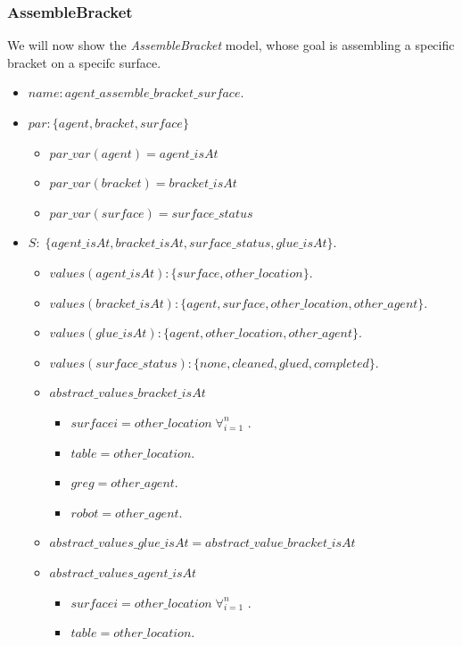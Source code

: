 \subsubsection{AssembleBracket}
We will now show the \textit{AssembleBracket} model, whose goal is assembling a specific bracket on a specifc surface.
\begin{itemize}
	\item $name: agent\_assemble\_bracket\_surface$.
	\item		$par: \{agent,bracket,surface\}$
		\begin{itemize}
			\item $par\_var(agent)=agent\_isAt$
			\item $par\_var(bracket)=bracket\_isAt$
			\item $par\_var(surface)=surface\_status$
		\end{itemize}

	\item $S:\;\{agent\_isAt,bracket\_isAt,surface\_status,glue\_isAt\}$. 
		\begin{itemize}
			\item $values(agent\_isAt):\{surface,other\_location\}$.
			\item $values(bracket\_isAt):\{agent,surface, other\_location,other\_agent\}$. 
			\item $values(glue\_isAt):\{agent,other\_location,other\_agent\}$. 
			\item $values(surface\_status):\{none,cleaned,glued,completed\}$.
		\end{itemize}
		\begin{itemize}
			\item $abstract\_values\_bracket\_isAt$ 
				\begin{itemize}
					\item $surfacei=other\_location\; \forall_{i=1}^n$ .
					\item $table=other\_location$.
					\item $greg=other\_agent$.
					\item $robot=other\_agent$.
				\end{itemize}	
			\item $abstract\_values\_glue\_isAt=abstract\_value\_bracket\_isAt$ 
			\item $abstract\_values\_agent\_isAt$
				\begin{itemize}
					\item $surfacei=other\_location\; \forall_{i=1}^n$ .
					\item $table=other\_location$.
				\end{itemize}
		\end{itemize}
		

\end{itemize}
